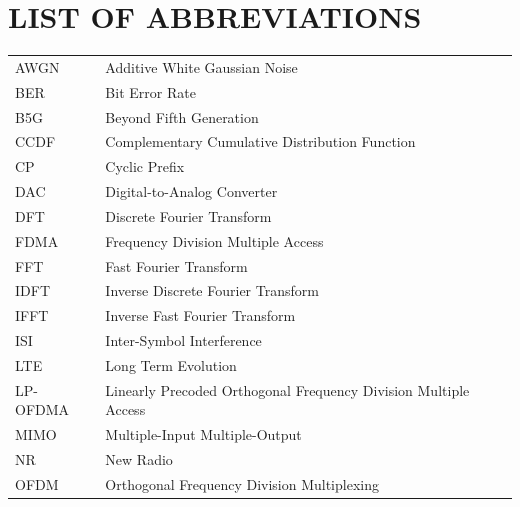 
\section*{LIST OF ABBREVIATIONS}
{}

\begin{tabularx}{\textwidth}{L{0.45} L{1.55}}

AWGN      & Additive White Gaussian Noise \\

BER       & Bit Error Rate \\

B5G       & Beyond Fifth Generation \\

CCDF      & Complementary Cumulative Distribution Function \\

CP        & Cyclic Prefix \\

DAC       & Digital-to-Analog Converter \\

DFT       & Discrete Fourier Transform \\

FDMA      & Frequency Division Multiple Access \\

FFT       & Fast Fourier Transform \\

IDFT      & Inverse Discrete Fourier Transform \\

IFFT      & Inverse Fast Fourier Transform \\

ISI       & Inter-Symbol Interference \\

LTE       & Long Term Evolution \\

LP-OFDMA  & Linearly Precoded Orthogonal Frequency Division Multiple Access \\

MIMO      & Multiple-Input Multiple-Output \\

NR        & New Radio \\

OFDM      & Orthogonal Frequency Division Multiplexing \\


\end{tabularx}
